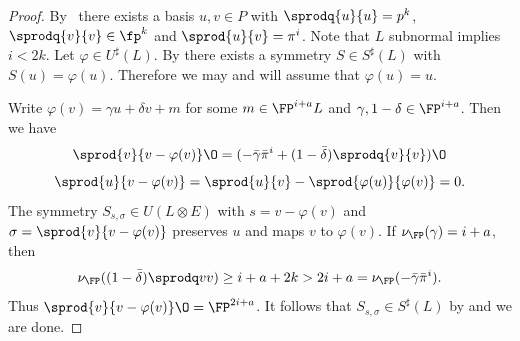 \begin{proof}
%
%
%
  By~\cite{Jacobowitz1962} there exists a basis $u, v \in P$ with $\sprodq{u}{u} = p^k$, $\sprodq{v}{v}\in \fp^{k}$ and
  $\sprod{u}{v}=\pi^i$. Note that $L$ subnormal implies $i<2k$. Let $\varphi \in U^\sharp(L)$.
  By  there exists a symmetry $S \in S^\sharp(L)$ with $S(u) = \varphi(u)$. Therefore we may and will assume that $\varphi(u) = u$.

  Write $\varphi(v) = \gamma u + \delta v + m$ for some $m \in \FP^{i+a}L$ and $\gamma,1-\delta \in \FP^{i+a}$.
  Then we have
  \[\sprod{v}{v-\varphi(v)}\O=(-\bar \gamma \bar \pi^i+(1-\bar\delta)\sprodq{v}{v})\O\]
  \begin{equation}\label{deltaunit}
    \sprod{u}{v-\varphi(v)} = \sprod{u}{v}-\sprod{\varphi(u)}{\varphi(v)} = 0.
  \end{equation}
  The symmetry $S_{s,\sigma} \in U(L\otimes E)$ with $s=v - \varphi(v)$ and $\sigma = \sprod{v}{v-\varphi(v)}$ preserves $u$ and maps $v$ to $\varphi(v)$.
  If $\nu_\FP(\gamma) = i+a$, then
  \[ \nu_\FP((1 - \bar \delta)\sprodq v v)  \geq i + a + 2k > 2i + a = \nu_\FP(-\bar \gamma \bar \pi^i). \]
  Thus $\sprod{v}{v-\varphi(v)}\O = \FP^{2i+a}$.
  It follows that $S_{s,\sigma} \in S^\sharp(L)$ by  and we are done.


\end{proof}
